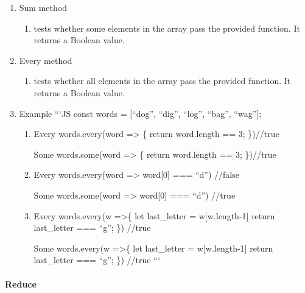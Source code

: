 \documentclass[
  paper=a4,
  ,captions=tableheading
]{scrartcl}
\providecommand{\tightlist}{%
  \setlength{\itemsep}{0pt}\setlength{\parskip}{0pt}}
\begin{document}
\begin{enumerate}
\def\labelenumi{\arabic{enumi}.}
\tightlist
\item
  Sum method

  \begin{enumerate}
  \def\labelenumii{\arabic{enumii}.}
  \tightlist
  \item
    tests whether some elements in the array pass the provided function.
    It returns a Boolean value.
  \end{enumerate}
\item
  Every method

  \begin{enumerate}
  \def\labelenumii{\arabic{enumii}.}
  \tightlist
  \item
    tests whether all elements in the array pass the provided function.
    It returns a Boolean value.
  \end{enumerate}
\item
  Example ```JS const words = {[}``dog'', ``dig'', ``log'', ``bag'',
  ``wag''{]};

  \begin{enumerate}
  \def\labelenumii{\arabic{enumii}.}
  \item
    Every words.every(word =\textgreater{} \{ return word.length == 3;
    \})//true

    Some words.some(word =\textgreater{} \{ return word.length == 3;
    \})//true
  \item
    Every words.every(word =\textgreater{} word{[}0{]} === ``d'')
    //false

    Some words.some(word =\textgreater{} word{[}0{]} === ``d'') //true
  \item
    Every words.every(w =\textgreater\{ let last\_letter =
    w{[}w.length-1{]} return last\_letter === ``g''; \}) //true

    Some words.every(w =\textgreater\{ let last\_letter =
    w{[}w.length-1{]} return last\_letter === ``g''; \}) //true ```
  \end{enumerate}
\end{enumerate}

\hypertarget{reduce}{%
\paragraph{Reduce}\label{reduce}}
\end{document}
